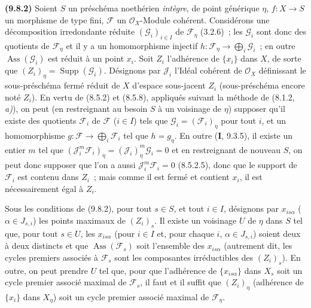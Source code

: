 \label{IV.9.8.2-fr}%
\textbf{(9.8.2)} Soient $S$ un préschéma noethérien \emph{intègre}, de point
générique $\eta$, $f:X\to S$ un morphisme de type fini, $\mathcal F$ un
$\mathcal O_X$-Module cohérent. Considérons une décomposition irredondante
réduite $(\mathcal G_i)_{i\in I}$ de $\mathcal F_\eta$ (3.2.6)~; les
$\mathcal G_i$ sont donc des quotients de $\mathcal F_\eta$ et il y a un
homomorphisme injectif
$h:\mathcal F_\eta\to\bigoplus_i\mathcal G_i$~; en outre
$\operatorname{Ass}(\mathcal G_i)$ est réduit à un point $x_i$. Soit $Z_i$
l'adhérence de $\{x_i\}$ dans $X$, de sorte que
$(Z_i)_\eta=\operatorname{Supp}(\mathcal G_i)$. Désignons par $\mathcal J_i$
l'Idéal cohérent de $\mathcal O_X$ définissant le sous-préschéma fermé réduit de
$X$ d'espace sous-jacent $Z_i$ (sous-préschéma encore noté $Z_i$). En vertu de
(8.5.2) et (8.5.8), appliqués suivant la méthode de (8.1.2, \emph{a)}), on peut
(en restreignant au besoin $S$ à un voisinage de $\eta$) supposer qu'il existe
des quotients $\mathcal F_i$ de $\mathcal F$ ($i\in I$) tels que
$\mathcal G_i=(\mathcal F_i)_\eta$ pour tout $i$, et un homomorphisme
$g:\mathcal F\to\bigoplus_i\mathcal F_i$ tel que $h=g_\eta$. En outre
(\textbf{I}, 9.3.5), il existe un entier $m$ tel que
$(\mathcal J_i^m\mathcal F_i)_\eta=(\mathcal J_i)_\eta^m\mathcal G_i=0$ et en
restreignant de nouveau $S$, on peut donc supposer que l'on a aussi
$\mathcal J_i^m\mathcal F_i=0$ (8.5.2.5), donc que le support de $\mathcal F_i$
est contenu dans $Z_i$~; mais comme il est fermé et contient $x_i$, il est
nécessairement égal à $Z_i$.

\begin{proposition}[9.8.3]
\label{IV.9.8.3-fr}
Sous les conditions de (9.8.2), pour tout $s\in S$, et tout $i\in I$, désignons
par $x_{is\alpha}$ ($\alpha\in J_{s,i}$) les points maximaux de $(Z_i)_s$. Il
existe un voisinage $U$ de $\eta$ dans $S$ tel que, pour tout $s\in U$, les
$x_{is\alpha}$ (pour $i\in I$ et, pour chaque $i$, $\alpha\in J_{s,i}$) soient
deux à deux distincts et que $\operatorname{Ass}(\mathcal F_s)$ soit l'ensemble
des $x_{is\alpha}$ (autrement dit, les cycles premiers associés à $\mathcal F_s$
sont les composantes irréductibles des $(Z_i)_s$). En outre, on peut prendre
$U$ tel que, pour que l'adhérence de $\{x_{is\alpha}\}$ dans $X_s$ soit un cycle
premier associé maximal de $\mathcal F_s$, il faut et il suffit que $(Z_i)_\eta$
(adhérence de $\{x_i\}$ dans $X_\eta$) soit un cycle premier associé maximal de
$\mathcal F_\eta$.
\end{proposition}

